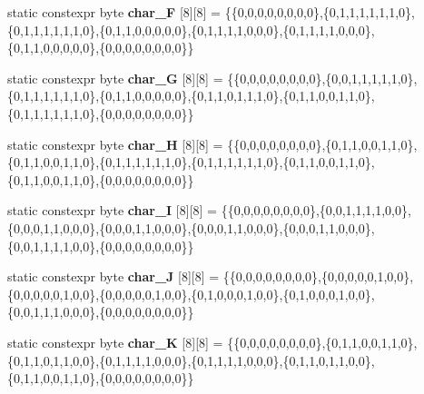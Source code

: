 \begin{DoxyCompactItemize}
\item 
static constexpr byte {\bfseries char\+\_\+F} \mbox{[}8\mbox{]}\mbox{[}8\mbox{]} = \{\{0,0,0,0,0,0,0,0\},\{0,1,1,1,1,1,1,0\},\{0,1,1,1,1,1,1,0\},\{0,1,1,0,0,0,0,0\},\{0,1,1,1,1,0,0,0\},\{0,1,1,1,1,0,0,0\},\{0,1,1,0,0,0,0,0\},\{0,0,0,0,0,0,0,0\}\}\hypertarget{classcharacters_a324f3868f6fd9e983e11c2447ed7a7ff}{}\label{classcharacters_a324f3868f6fd9e983e11c2447ed7a7ff}

\item 
static constexpr byte {\bfseries char\+\_\+G} \mbox{[}8\mbox{]}\mbox{[}8\mbox{]} = \{\{0,0,0,0,0,0,0,0\},\{0,0,1,1,1,1,1,0\},\{0,1,1,1,1,1,1,0\},\{0,1,1,0,0,0,0,0\},\{0,1,1,0,1,1,1,0\},\{0,1,1,0,0,1,1,0\},\{0,1,1,1,1,1,1,0\},\{0,0,0,0,0,0,0,0\}\}\hypertarget{classcharacters_a146f650d6e7f56233c20cb7796f0b077}{}\label{classcharacters_a146f650d6e7f56233c20cb7796f0b077}

\item 
static constexpr byte {\bfseries char\+\_\+H} \mbox{[}8\mbox{]}\mbox{[}8\mbox{]} = \{\{0,0,0,0,0,0,0,0\},\{0,1,1,0,0,1,1,0\},\{0,1,1,0,0,1,1,0\},\{0,1,1,1,1,1,1,0\},\{0,1,1,1,1,1,1,0\},\{0,1,1,0,0,1,1,0\},\{0,1,1,0,0,1,1,0\},\{0,0,0,0,0,0,0,0\}\}\hypertarget{classcharacters_a2884406026faf21e28a5574b2d6187ff}{}\label{classcharacters_a2884406026faf21e28a5574b2d6187ff}

\item 
static constexpr byte {\bfseries char\+\_\+I} \mbox{[}8\mbox{]}\mbox{[}8\mbox{]} = \{\{0,0,0,0,0,0,0,0\},\{0,0,1,1,1,1,0,0\},\{0,0,0,1,1,0,0,0\},\{0,0,0,1,1,0,0,0\},\{0,0,0,1,1,0,0,0\},\{0,0,0,1,1,0,0,0\},\{0,0,1,1,1,1,0,0\},\{0,0,0,0,0,0,0,0\}\}\hypertarget{classcharacters_ab2d3286ae407526a6a65cdea5b7dff29}{}\label{classcharacters_ab2d3286ae407526a6a65cdea5b7dff29}

\item 
static constexpr byte {\bfseries char\+\_\+J} \mbox{[}8\mbox{]}\mbox{[}8\mbox{]} = \{\{0,0,0,0,0,0,0,0\},\{0,0,0,0,0,1,0,0\},\{0,0,0,0,0,1,0,0\},\{0,0,0,0,0,1,0,0\},\{0,1,0,0,0,1,0,0\},\{0,1,0,0,0,1,0,0\},\{0,0,1,1,1,0,0,0\},\{0,0,0,0,0,0,0,0\}\}\hypertarget{classcharacters_ac2dfad6315de6aa610c4bd670629da19}{}\label{classcharacters_ac2dfad6315de6aa610c4bd670629da19}

\item 
static constexpr byte {\bfseries char\+\_\+K} \mbox{[}8\mbox{]}\mbox{[}8\mbox{]} = \{\{0,0,0,0,0,0,0,0\},\{0,1,1,0,0,1,1,0\},\{0,1,1,0,1,1,0,0\},\{0,1,1,1,1,0,0,0\},\{0,1,1,1,1,0,0,0\},\{0,1,1,0,1,1,0,0\},\{0,1,1,0,0,1,1,0\},\{0,0,0,0,0,0,0,0\}\}\hypertarget{classcharacters_a551351f2ca52b9be0b90b089d774652a}{}\label{classcharacters_a551351f2ca52b9be0b90b089d774652a}


\end{DoxyCompactItemize}
